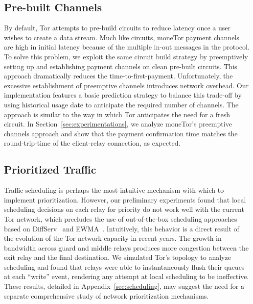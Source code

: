 \subsection{Pre-built Channels} By default, Tor attempts to pre-build circuits to reduce latency once a user wishes to create a data stream.
Much like circuits, moneTor payment channels are high in initial latency because of the multiple in-out messages in the protocol.
To solve this problem, we exploit the same circuit build strategy by preemptively setting up and establishing payment channels on clean pre-built circuits.
This approach dramatically reduces the time-to-first-payment.
Unfortunately, the excessive establishment of preemptive channels introduces network overhead.
Our implementation features a basic prediction strategy to balance this trade-off by using historical usage date to anticipate the required number of channels.
The approach is similar to the way in which Tor anticipates the need for a fresh circuit.
In Section~\ref{sec:experimentations}, we analyze moneTor's preemptive channels approach and show that the payment confirmation time matches the round-trip-time of the client-relay connection, as expected.

\subsection{Prioritized Traffic}
\label{subsub:prioritized}

Traffic scheduling is perhaps the most intuitive mechanism with which to implement prioritization.
However, our preliminary experiments found that local scheduling decisions on each relay for priority do not work well with the current Tor network, which precludes the use of out-of-the-box scheduling approaches based on DiffServ~\cite{dovrolis1999case} and EWMA~\cite{tang2010improved}.
Intuitively, this behavior is a direct result of the evolution of the Tor network capacity in recent years.
The growth in bandwidth across guard and middle relays produces more congestion between the exit relay and the final destination.
We simulated Tor's topology to analyze scheduling and found that relays were able to instantaneously flush their queues at each ``write'' event, rendering any attempt at local scheduling to be ineffective.
These results, detailed in Appendix~\ref{sec:scheduling}, may suggest the need for a separate comprehensive study of network prioritization mechanisms.

